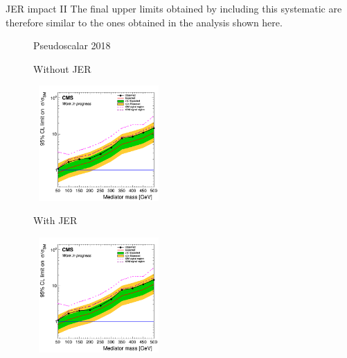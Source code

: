 \documentclass[8pt]{beamer}
\begin{document}
\begin{frame}{JER impact II}
\justifying
The final upper limits obtained by including this systematic are therefore similar to the ones obtained in the analysis shown here. \vfill

\begin{figure}[htbp]
\centering
\begin{block}{\centering Pseudoscalar 2018}\end{block}	\vspace{-8pt}

\begin{minipage}[b]{0.49\textwidth}
\begin{center}
\centering \begin{block}{\centering Without JER}\end{block}	
\includegraphics[width=5cm, height=4.4cm]{figs/limit_pseudo_2018_attempt7.png}
\end{center}
\end{minipage}\hfill
\begin{minipage}[b]{0.49\textwidth}
\begin{center}
\centering \begin{block}{\centering With JER}\end{block}	
\includegraphics[width=5cm, height=4.4cm]{figs/limit_pseudo_2018_attempt7.png}
\end{center}
\end{minipage} \hfill
\end{figure} \vfill
\end{frame}
\end{document}

